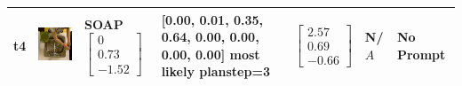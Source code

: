\begin{longtable}{| V{0.8cm} | V{2.6cm} | V{1.6cm} | V{2.1cm} | V{1.55cm} | V{1.6cm} | V{3.2cm} |}
t4 &
\includegraphics[width=\linewidth]{fig/system/_fast2-soap_.jpg} &
SOAP
\linebreak\linebreak
$\begin{bmatrix}
0 \\
0.73 \\
-1.52
\end{bmatrix}$ &
[0.00, 0.01, 0.35, 0.64, 0.00, 0.00, 0.00, 0.00] most likely planstep=3 &
$\begin{bmatrix}
2.57 \\
0.69 \\
-0.66
\end{bmatrix}$ &
N/$A$ &
No Prompt
\\ \hline



\end{longtable}
